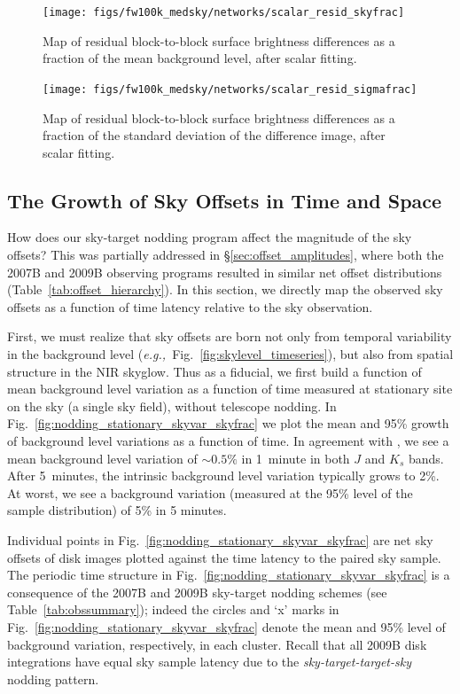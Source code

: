 \documentclass[iop]{emulateapj}
\newcommand{\eg}{\textit{e.g.,~}}
\newcommand{\Fig}[1]{Fig.~\ref{fig:#1}}  %
\newcommand{\Tab}[1]{Table~\ref{tab:#1}}  %
\newcommand{\Sec}[1]{\S\ref{sec:#1}}  %
\begin{document}
\begin{figure}[t]
\centering
\texttt{[image: figs/fw100k\_medsky/networks/scalar\_resid\_skyfrac]}
\caption{Map of residual block-to-block surface brightness differences as a fraction of the mean background level, after scalar fitting.}
\label{fig:fw100k_medsky_scalar_resid_skyfrac}
\end{figure}

\begin{figure}[t]
\centering
\texttt{[image: figs/fw100k\_medsky/networks/scalar\_resid\_sigmafrac]}
\caption{Map of residual block-to-block surface brightness differences as a fraction of the standard deviation of the difference image, after scalar fitting.}
\label{fig:fw100k_medsky_scalar_resid_sigmafrac}
\end{figure}


\subsection{The Growth of Sky Offsets in Time and Space}
\label{sec:offsetevo}

How does our sky-target nodding program affect the magnitude of the sky offsets?
This was partially addressed in \Sec{offset_amplitudes}, where both the 2007B and 2009B observing programs resulted in similar net offset distributions (\Tab{offset_hierarchy}).
In this section, we directly map the observed sky offsets as a function of time latency relative to the sky observation.

First, we must realize that sky offsets are born not only from temporal variability in the background level (\eg \Fig{skylevel_timeseries}), but also from spatial structure in the NIR skyglow.
Thus as a fiducial, we first build a function of mean background level variation as a function of time measured at stationary site on the sky (a single sky field), without telescope nodding.
In \Fig{nodding_stationary_skyvar_skyfrac} we plot the mean and 95\% growth of background level variations as a function of time.
In agreement with \cite{Vaduvescu:2004}, we see a mean background level variation of $\sim 0.5\%$ in 1~minute in both $J$ and $K_s$ bands.
After 5~minutes, the intrinsic background level variation typically grows to 2\%.
At worst, we see a background variation (measured at the 95\% level of the sample distribution) of 5\% in 5 minutes.

Individual points in \Fig{nodding_stationary_skyvar_skyfrac} are net sky offsets of disk images plotted against the time latency to the paired sky sample.
The periodic time structure in \Fig{nodding_stationary_skyvar_skyfrac} is a consequence of the 2007B and 2009B sky-target nodding schemes (see \Tab{obssummary}); indeed the circles and `x' marks in \Fig{nodding_stationary_skyvar_skyfrac} denote the mean and 95\% level of background variation, respectively, in each cluster.
Recall that all 2009B disk integrations have equal sky sample latency due to the \emph{sky-target-target-sky} nodding pattern.
\end{document}
